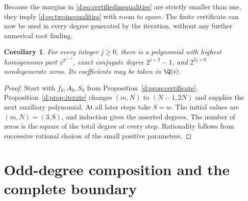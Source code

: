 \documentclass[UTF8,11pt]{ctexart}
\newtheorem{cor}[thm]{Corollary}
\theoremstyle{definition}
\numberwithin{equation}{section}
\begin{document}
Because the margins in \eqref{d:eq:certifiedinequalities} are strictly
smaller than one, they imply \eqref{d:eq:twoinequalities} with room to spare.
The finite certificate can now be used in every degree generated by the
iteration, without any further numerical root finding.
\begin{cor}\label{d:cor:powersoftwo}
For every integer $j\ge0$, there is a polynomial with highest homogeneous
part $z^{2^{j+3}}$, exact conjugate degree $2^{j+2}-1$, and
$2^{2j+6}$ nondegenerate zeros. Its coefficients may be taken in $\Q(i)$.
\end{cor}
\begin{proof}
Start with $f_0,A_0,S_0$ from Proposition~\ref{d:prop:certificate}.
Proposition~\ref{d:prop:iterate} changes $(m,N)$ to $(N-1,2N)$ and supplies
the next auxiliary polynomial. At all later steps take $S=w$.
The initial values are $(m,N)=(3,8)$, and induction gives the asserted
degrees. The number of zeros is the square of the total degree at every
step. Rationality follows from successive rational choices of the small
positive parameters.
\end{proof}

\section{Odd-degree composition and the complete boundary}\label{d:sec:composition}
\end{document}
